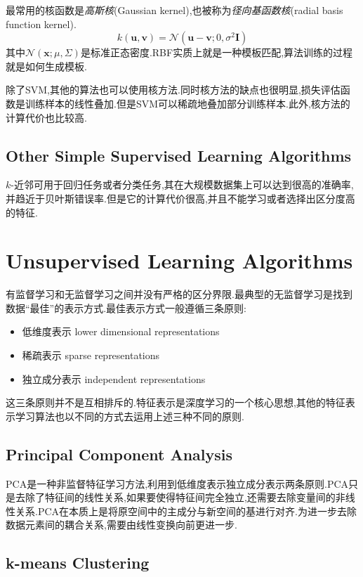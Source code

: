 最常用的核函数是\textit{高斯核}(Gaussian kernel),也被称为\textit{径向基函数核}(radial basis function kernel).
\begin{equation}
k(\bm{u,v})=\mathcal N(\bm{u-v};0,\sigma^2\bm I)
\end{equation}
其中$\mathcal N(\bm x;\mu,\Sigma)$是标准正态密度.RBF实质上就是一种模板匹配,算法训练的过程就是如何生成模板.

除了SVM,其他的算法也可以使用核方法.同时核方法的缺点也很明显,损失评估函数是训练样本的线性叠加.但是SVM可以稀疏地叠加部分训练样本.此外,核方法的计算代价也比较高.

\subsection{Other Simple Supervised Learning Algorithms}

$k$-近邻可用于回归任务或者分类任务,其在大规模数据集上可以达到很高的准确率,并趋近于贝叶斯错误率.但是它的计算代价很高,并且不能学习或者选择出区分度高的特征.

\section{Unsupervised Learning Algorithms}

有监督学习和无监督学习之间并没有严格的区分界限.最典型的无监督学习是找到数据``最佳''的表示方式.最佳表示方式一般遵循三条原则:
\begin{itemize}
\item 低维度表示 lower dimensional representations
\item 稀疏表示 sparse representations
\item 独立成分表示 independent representations
\end{itemize}
这三条原则并不是互相排斥的.特征表示是深度学习的一个核心思想,其他的特征表示学习算法也以不同的方式去运用上述三种不同的原则.

\subsection{Principal Component Analysis}

PCA是一种非监督特征学习方法,利用到低维度表示独立成分表示两条原则.PCA只是去除了特征间的线性关系,如果要使得特征间完全独立,还需要去除变量间的非线性关系.PCA在本质上是将原空间中的主成分与新空间的基进行对齐.为进一步去除数据元素间的耦合关系,需要由线性变换向前更进一步.

\subsection{k-means Clustering}

